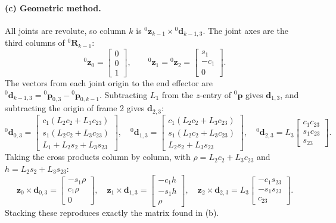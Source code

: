 \documentclass[11pt]{article}
\newcommand{\R}{\bm{R}}
\newcommand{\dvec}{\bm{d}}
\begin{document}
\paragraph{(c) Geometric method.} All joints are revolute, so column $k$ is ${}^0\bm{z}_{k-1}\times{}^0\dvec_{k-1,3}$. The joint axes are the third columns of ${}^0\R_{k-1}$:
\[
{}^0\bm{z}_0=\begin{bmatrix}0\\0\\1\end{bmatrix},\qquad
{}^0\bm{z}_1={}^0\bm{z}_2=\begin{bmatrix}s_1\\-c_1\\0\end{bmatrix}.
\]
The vectors from each joint origin to the end effector are ${}^0\dvec_{k-1,3}={}^0\bm{p}_{0,3}-{}^0\bm{p}_{0,k-1}$. Subtracting $L_1$ from the $z$-entry of ${}^0\bm{p}$ gives $\dvec_{1,3}$, and subtracting the origin of frame 2 gives $\dvec_{2,3}$:
\[
{}^0\dvec_{0,3}=\begin{bmatrix}c_1(L_2c_2+L_3c_{23})\\ s_1(L_2c_2+L_3c_{23})\\ L_1+L_2s_2+L_3s_{23}\end{bmatrix},\quad
{}^0\dvec_{1,3}=\begin{bmatrix}c_1(L_2c_2+L_3c_{23})\\ s_1(L_2c_2+L_3c_{23})\\ L_2s_2+L_3s_{23}\end{bmatrix},\quad
{}^0\dvec_{2,3}=L_3\begin{bmatrix}c_1c_{23}\\ s_1c_{23}\\ s_{23}\end{bmatrix}.
\]
Taking the cross products column by column, with $\rho=L_2c_2+L_3c_{23}$ and $h=L_2s_2+L_3s_{23}$:
\[
\bm{z}_0\times\dvec_{0,3}=\begin{bmatrix}-s_1\rho\\c_1\rho\\0\end{bmatrix},\quad
\bm{z}_1\times\dvec_{1,3}=\begin{bmatrix}-c_1h\\-s_1h\\\rho\end{bmatrix},\quad
\bm{z}_2\times\dvec_{2,3}=L_3\begin{bmatrix}-c_1s_{23}\\-s_1s_{23}\\c_{23}\end{bmatrix}.
\]
Stacking these reproduces exactly the matrix found in (b).
\end{document}
